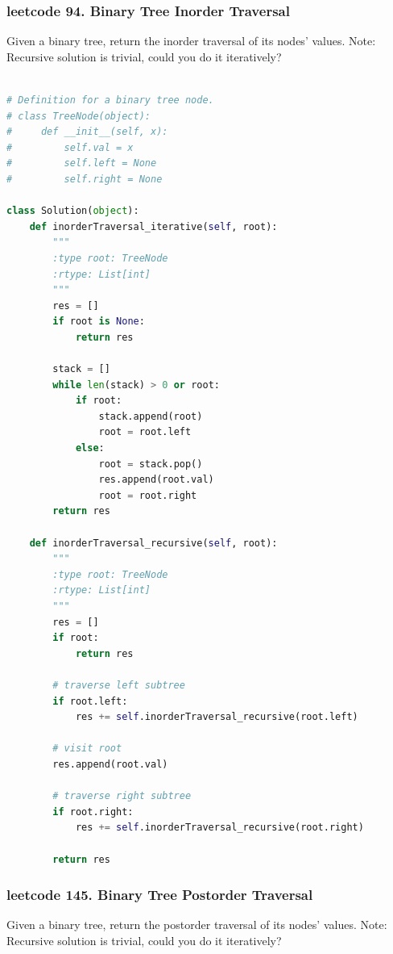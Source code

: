 \documentclass[a4paper,10pt]{article}
\begin{document}
\subsubsection{leetcode 94. Binary Tree Inorder Traversal}
Given a binary tree, return the inorder traversal of its nodes' values. Note: Recursive solution is trivial, could you do it iteratively? \\

\begin{lstlisting}[language=Python, caption=Problem94. Binary Tree Inorder Traversal]

# Definition for a binary tree node.
# class TreeNode(object):
#     def __init__(self, x):
#         self.val = x
#         self.left = None
#         self.right = None

class Solution(object):
    def inorderTraversal_iterative(self, root):
        """
        :type root: TreeNode
        :rtype: List[int]
        """
        res = []
        if root is None:
            return res

        stack = []
        while len(stack) > 0 or root:
            if root:
                stack.append(root)
                root = root.left
            else:
                root = stack.pop()
                res.append(root.val)
                root = root.right
        return res

    def inorderTraversal_recursive(self, root):
        """
        :type root: TreeNode
        :rtype: List[int]
        """
        res = []
        if root:
            return res

        # traverse left subtree
        if root.left:
            res += self.inorderTraversal_recursive(root.left)

        # visit root
        res.append(root.val)

        # traverse right subtree
        if root.right:
            res += self.inorderTraversal_recursive(root.right)

        return res
\end{lstlisting}



\subsubsection{leetcode 145. Binary Tree Postorder Traversal}
Given a binary tree, return the postorder traversal of its nodes' values. Note: Recursive solution is trivial, could you do it iteratively? \\
\end{document}
